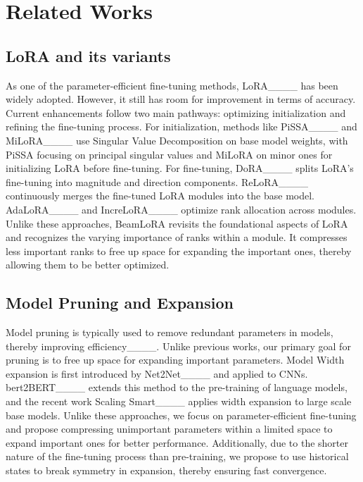 \section{Related Works}
\subsection{LoRA and its variants}
As one of the parameter-efficient fine-tuning methods, LoRA____ has been widely adopted. However, it still has room for improvement in terms of accuracy.
Current enhancements follow two main pathways: optimizing initialization and refining the fine-tuning process. For initialization, methods like PiSSA____ and MiLoRA____ use Singular Value Decomposition on base model weights, with PiSSA focusing on principal singular values and MiLoRA on minor ones for initializing LoRA before fine-tuning.
For fine-tuning, DoRA____ splits LoRA’s fine-tuning into magnitude and direction components. ReLoRA____ continuously merges the fine-tuned LoRA modules into the base model.  AdaLoRA____ and IncreLoRA____ optimize rank allocation across modules.
Unlike these approaches, BeamLoRA revisits the foundational aspects of LoRA and recognizes the varying importance of ranks within a module. It compresses less important ranks to free up space for expanding the important ones, thereby allowing them to be better optimized.
\subsection{Model Pruning and Expansion}
Model pruning is typically used to remove redundant parameters in models, thereby improving efficiency____. Unlike previous works, our primary goal for pruning is to free up space for expanding important parameters.
Model Width expansion is first introduced by Net2Net____ and applied to CNNs. bert2BERT____ extends this method to the pre-training of language models, and the recent work Scaling Smart____ applies width expansion to large scale base models. Unlike these approaches, we focus on parameter-efficient fine-tuning and propose compressing unimportant parameters within a limited space to expand important ones for better performance. Additionally, due to the shorter nature of the fine-tuning process than pre-training, we propose to use historical states to break symmetry in expansion, thereby ensuring fast convergence.